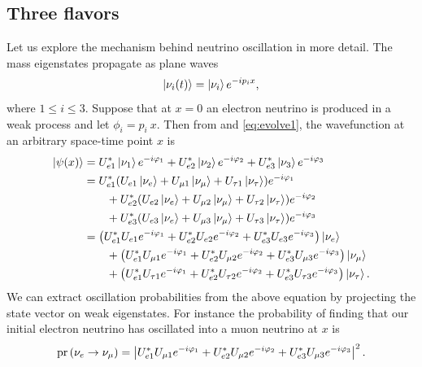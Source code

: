 \subsection{Three flavors}
Let us explore the mechanism behind neutrino oscillation in more detail.
The mass eigenstates propagate as plane waves
\begin{equation}
  \label{eq:evolve1}
  \ket{\nu_i(t)}=\ket{\nu_i}e^{-ip_ix},
\end{equation}
where $1\leq i\leq3$. Suppose that at $x=0$ an electron neutrino
is produced in a weak process and let $\phi_i=p_i~x$. Then from  
and \eqref{eq:evolve1}, the wavefunction at an arbitrary
space-time point $x$ is
\begin{equation}
  \begin{aligned}
    \ket{\psi(x)}&=U_{e1}^*\ket{\nu_1}e^{-i\varphi_1}
                  +U_{e2}^*\ket{\nu_2}e^{-i\varphi_2}
                  +U_{e3}^*\ket{\nu_3}e^{-i\varphi_3} \\
                 &=U_{e1}^*(U_{e1}\ket{\nu_e}+U_{\mu 1}\ket{\nu_\mu}
                   +U_{\tau 1}\ket{\nu_\tau})e^{-i\varphi_1} \\
                 &~~~~~~
                  +U_{e2}^*(U_{e2}\ket{\nu_e}+U_{\mu 2}\ket{\nu_\mu}
                   +U_{\tau 2}\ket{\nu_\tau})e^{-i\varphi_2} \\
                 &~~~~~~
                  +U_{e3}^*(U_{e3}\ket{\nu_e}+U_{\mu 3}\ket{\nu_\mu}
                   +U_{\tau 3}\ket{\nu_\tau})e^{-i\varphi_3} \\
                 &=\left(U_{e1}^*U_{e1}e^{-i\varphi_1}
                    +U_{e2}^*U_{e2}e^{-i\varphi_2}
                    +U_{e3}^*U_{e3}e^{-i\varphi_3}\right)\ket{\nu_e} \\
                 &~~~~~~
                   +\left(U_{e1}^*U_{\mu 1}e^{-i\varphi_1}
                    +U_{e2}^*U_{\mu 2}e^{-i\varphi_2}
                    +U_{e3}^*U_{\mu 3}e^{-i\varphi_3}\right)\ket{\nu_\mu} \\
                 &~~~~~~
                   +\left(U_{e1}^*U_{\tau 1}e^{-i\varphi_1}
                    +U_{e2}^*U_{\tau 2}e^{-i\varphi_2}
                    +U_{e3}^*U_{\tau 3}e^{-i\varphi_3}\right)\ket{\nu_\tau}.
  \end{aligned}
\end{equation}
We can extract oscillation probabilities from the above equation by projecting
the state vector on weak eigenstates. For instance the probability of finding
that our initial electron neutrino has oscillated into a muon neutrino at $x$ is
\begin{equation}
  \pr{\nu_e\to\nu_\mu}=\left|U_{e1}^*U_{\mu 1}e^{-i\phi_1}
                    +U_{e2}^*U_{\mu 2}e^{-i\phi_2}
                    +U_{e3}^*U_{\mu 3}e^{-i\phi_3}\right|^2.
\end{equation}
